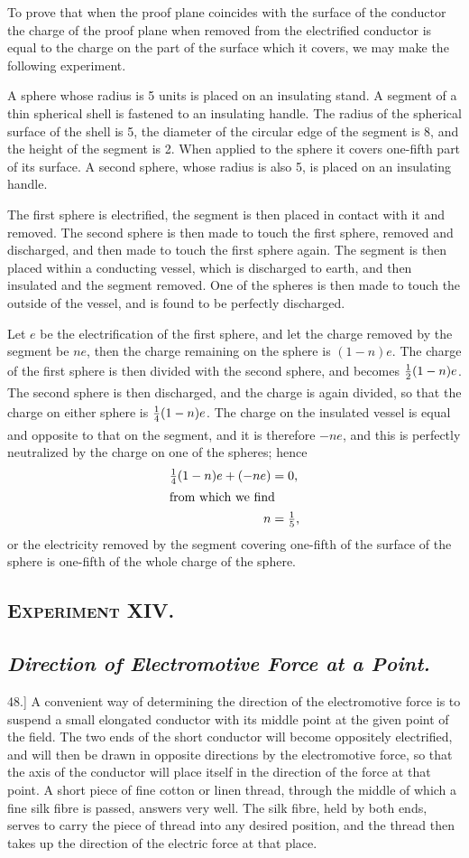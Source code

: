 \documentclass[12pt,oneside]{book}[2021/10/04]
\newcommand{\Heading}{\centering\normalfont}
\newcommand{\Section}[1]{\subsection*{\normalsize\Heading\scshape #1}}
\newcommand{\Subsection}[1]{\subsection*{\normalsize\Heading\itshape #1}}
\newcommand{\Runhead}[1]{\fancyhead[C]{\iffloatpage{}{\small#1}}}
\newcommand{\article}[1]{\phantomsection \label{art:#1}{#1.]}}
\newcommand{\tstrut}{\rule[-1.5ex]{0pt}{4.2ex}}
\newcommand{\¬}{\hphantom{0}}
\begin{document}
To prove that when the proof plane coincides with the surface of
the conductor the charge of the proof plane when removed from
the electrified conductor is equal to the charge on the part of the
surface which it covers, we may make the following experiment.

A sphere whose radius is 5 units is placed on an insulating
stand. A segment of a thin spherical shell is fastened to an insulating
handle. The radius of the spherical surface of the shell
is 5, the diameter of the circular edge of the segment is 8, and the
height of the segment is 2. When applied to the sphere it covers
one-fifth part of its surface. A second sphere, whose radius is
also 5, is placed on an insulating handle.

The first sphere is electrified, the segment is then placed in
contact with it and removed. The second sphere is then made to
touch the first sphere, removed and discharged, and then made to
touch the first sphere again. The segment is then placed within
a conducting vessel, which is discharged to earth, and then insulated
and the segment removed. One of the spheres is then
made to touch the outside of the vessel, and is found to be perfectly
discharged.

Let \(e\) be the electrification of the first sphere, and let the charge
removed by the segment be \(ne\), then the charge remaining on the
sphere is \((1 - n)e\). The charge of the first sphere is then divided
with the second sphere, and becomes \(\tstrut\frac{1}{2}(1 - n)e\). The second sphere
is then discharged, and the charge is again divided, so that the
charge on either sphere is \(\tstrut\frac{1}{4}(1 - n)e\). The charge on the insulated
vessel is equal and opposite to that on the segment, and it is therefore
\(-ne\), and this is perfectly neutralized by the charge on one of
the spheres; hence
\begin{align*}
\tfrac{1}{4}(1 - n)e + (-ne) &= 0\text{,}\\
\shortintertext{from which we find}
n &= \tfrac{1}{5}\text{,}
\end{align*}
or the electricity removed by the segment covering one-fifth of the
surface of the sphere is one-fifth of the whole charge of the sphere.

\Section{Experiment XIV.}

\Subsection{Direction of Electromotive Force at a Point.}

\article{48} A convenient way of determining the direction of the electromotive
force is to suspend a small elongated conductor with its
middle point at the given point of the field. The two ends of the
short conductor will become oppositely electrified, and will then be
drawn in opposite directions by the electromotive force, so that the
axis of the conductor will place itself in the direction of the force
at that point. A short piece of fine cotton or linen thread, through
the middle of which a fine silk fibre is passed, answers very well.
The silk fibre, held by both ends, serves to carry the piece of thread
into any desired position, and the thread then takes up the direction
of the electric force at that place.
\Runhead{ELECTROMOTIVE FORCE AND POTENTIAL.}
\end{document}
